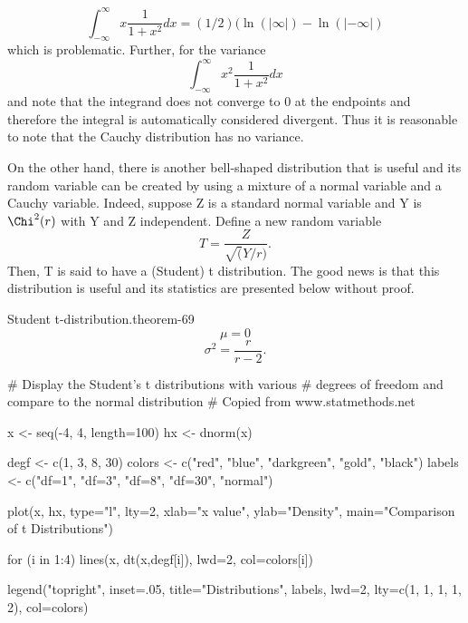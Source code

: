 \documentclass[10pt,]{book}
\numberwithin{equation}{section}
\begin{document}
\begin{equation*}
\int_{-\infty}^{\infty} x \frac{1}{1+x^2} dx = (1/2) ( \ln( | \infty |) - \ln( | -\infty |)
\end{equation*}
which is problematic.  Further, for the variance%
\begin{equation*}
\int_{-\infty}^{\infty} x^2 \frac{1}{1+x^2} dx 
\end{equation*}
and note that the integrand does not converge to 0 at the endpoints and therefore the integral is automatically considered divergent.  Thus it is reasonable to note that the Cauchy distribution has no variance.%
\par
\hypertarget{p-1211}{}%
On the other hand, there is another bell-shaped distribution that is useful and its random variable can be created by using a mixture of a normal variable and a Cauchy variable. Indeed, suppose Z is a standard normal variable and Y is \(\Chi^2(r)\) with Y and Z independent.  Define a new random variable%
\begin{equation*}
T = \frac{Z}{\sqrt(Y/r)}.
\end{equation*}
Then, T is said to have a (Student) t distribution.  The good news is that this distribution is useful and its statistics are presented below without proof. \begin{theorem}{Student t-distribution.}{}{theorem-69}%
%
\begin{equation*}
\mu = 0
\end{equation*}
%
\begin{equation*}
\sigma^2 = \frac{r}{r-2}.
\end{equation*}
\end{theorem}
%
\begin{sageinput}
# Display the Student's t distributions with various
# degrees of freedom and compare to the normal distribution
# Copied from www.statmethods.net

x <- seq(-4, 4, length=100)
hx <- dnorm(x)

degf <- c(1, 3, 8, 30)
colors <- c("red", "blue", "darkgreen", "gold", "black")
labels <- c("df=1", "df=3", "df=8", "df=30", "normal")

plot(x, hx, type="l", lty=2, xlab="x value",
  ylab="Density", main="Comparison of t Distributions")

for (i in 1:4){
  lines(x, dt(x,degf[i]), lwd=2, col=colors[i])
}

legend("topright", inset=.05, title="Distributions",
  labels, lwd=2, lty=c(1, 1, 1, 1, 2), col=colors)
\end{sageinput}
%
%
\typeout{************************************************}
\typeout{************************************************}
%
\end{document}
